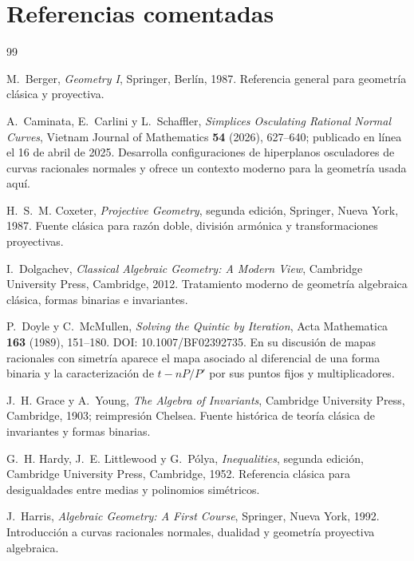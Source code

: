 \documentclass[11pt,oneside]{scrartcl}
\theoremstyle{plainblue}
\theoremstyle{definitionblue}
\theoremstyle{remarkgray}
\begin{document}
\section{Referencias comentadas}

\begin{thebibliography}{99}

M.~Berger,
\emph{Geometry I},
Springer, Berlín, 1987.
\newblock Referencia general para geometría clásica y proyectiva.

A.~Caminata, E.~Carlini y L.~Schaffler,
\emph{Simplices Osculating Rational Normal Curves},
Vietnam Journal of Mathematics \textbf{54} (2026), 627--640; publicado en línea el 16 de abril de 2025.
\newblock Desarrolla configuraciones de hiperplanos osculadores de curvas racionales normales y ofrece un contexto moderno para la geometría usada aquí.

H.~S.~M. Coxeter,
\emph{Projective Geometry}, segunda edición,
Springer, Nueva York, 1987.
\newblock Fuente clásica para razón doble, división armónica y transformaciones proyectivas.

I.~Dolgachev,
\emph{Classical Algebraic Geometry: A Modern View},
Cambridge University Press, Cambridge, 2012.
\newblock Tratamiento moderno de geometría algebraica clásica, formas binarias e invariantes.

P.~Doyle y C.~McMullen,
\emph{Solving the Quintic by Iteration},
Acta Mathematica \textbf{163} (1989), 151--180. DOI: 10.1007/BF02392735.
\newblock En su discusión de mapas racionales con simetría aparece el mapa asociado al diferencial de una forma binaria y la caracterización de \(t-nP/P'\) por sus puntos fijos y multiplicadores.

J.~H. Grace y A.~Young,
\emph{The Algebra of Invariants},
Cambridge University Press, Cambridge, 1903; reimpresión Chelsea.
\newblock Fuente histórica de teoría clásica de invariantes y formas binarias.

G.~H. Hardy, J.~E. Littlewood y G.~Pólya,
\emph{Inequalities}, segunda edición,
Cambridge University Press, Cambridge, 1952.
\newblock Referencia clásica para desigualdades entre medias y polinomios simétricos.

J.~Harris,
\emph{Algebraic Geometry: A First Course},
Springer, Nueva York, 1992.
\newblock Introducción a curvas racionales normales, dualidad y geometría proyectiva algebraica.


\end{thebibliography}
\end{document}
